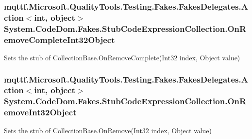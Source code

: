 \hypertarget{class_system_1_1_code_dom_1_1_fakes_1_1_stub_code_expression_collection_a82837b26385661e5b30f6b5d12c8cc34}{
\subsubsection[{On\-Remove\-Complete\-Int32\-Object}]{\setlength{\rightskip}{0pt plus 5cm}mqttf.\-Microsoft.\-Quality\-Tools.\-Testing.\-Fakes.\-Fakes\-Delegates.\-Action$<$int, object$>$ System.\-Code\-Dom.\-Fakes.\-Stub\-Code\-Expression\-Collection.\-On\-Remove\-Complete\-Int32\-Object}}\label{class_system_1_1_code_dom_1_1_fakes_1_1_stub_code_expression_collection_a82837b26385661e5b30f6b5d12c8cc34}


Sets the stub of Collection\-Base.\-On\-Remove\-Complete(\-Int32 index, Object value)

\hypertarget{class_system_1_1_code_dom_1_1_fakes_1_1_stub_code_expression_collection_a110b53106991c6fb6e77adfab4a4f2ac}{
\subsubsection[{On\-Remove\-Int32\-Object}]{\setlength{\rightskip}{0pt plus 5cm}mqttf.\-Microsoft.\-Quality\-Tools.\-Testing.\-Fakes.\-Fakes\-Delegates.\-Action$<$int, object$>$ System.\-Code\-Dom.\-Fakes.\-Stub\-Code\-Expression\-Collection.\-On\-Remove\-Int32\-Object}}\label{class_system_1_1_code_dom_1_1_fakes_1_1_stub_code_expression_collection_a110b53106991c6fb6e77adfab4a4f2ac}


Sets the stub of Collection\-Base.\-On\-Remove(\-Int32 index, Object value)

